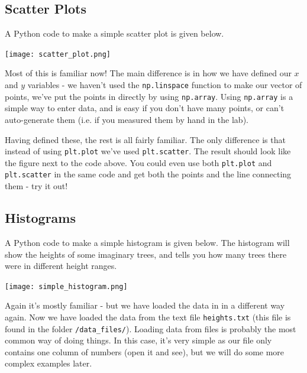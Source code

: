 \documentclass[10pt,a4paper]{memoir}
\begin{document}
\subsection{Scatter Plots}
A Python code to make a simple scatter plot is given below. 

\begin{minipage}{0.48\textwidth}
\end{minipage}
\quad
\begin{minipage}{0.48\textwidth}
		\centering
		\texttt{[image: scatter\_plot.png]}
\end{minipage}

Most of this is familiar now! The main difference is in how we have defined our $x$ and $y$ variables - we haven't used the \texttt{np.linspace} function to make our vector of points, we've put the points in directly by using \texttt{np.array}. Using \texttt{np.array} is a simple way to enter data, and is easy if you don't have many points, or can't auto-generate them (i.e. if you measured them by hand in the lab). 

Having defined these, the rest is all fairly familiar. The only difference is that instead of using \texttt{plt.plot} we've used \texttt{plt.scatter}. The result should look like the figure next to the code above. You could even use both \texttt{plt.plot} and \texttt{plt.scatter} in the same code and get both the points and the line connecting them - try it out!

\subsection{Histograms}
A Python code to make a simple histogram is given below. The histogram will show the heights of some imaginary trees, and tells you how many trees there were in different height ranges.

\begin{minipage}{0.48\textwidth}
\end{minipage}
\quad
\begin{minipage}{0.48\textwidth}
		\centering
		\texttt{[image: simple\_histogram.png]}
\end{minipage}

Again it's mostly familiar - but we have loaded the data in in a different way again. Now we have loaded the data from the text file \texttt{heights.txt} (this file is found in the folder \texttt{/data\_files/}). Loading data from files is probably the most common way of doing things. In this case, it's very simple as our file only contains one column of numbers (open it and see), but we will do some more complex examples later.
\end{document}
